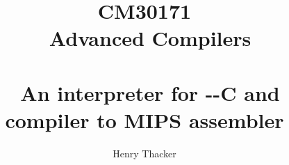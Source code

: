 \documentclass[a4paper,11pt]{report}
\title{\textbf{CM30171 \\ \ Advanced Compilers} \\ \ \\ \ An interpreter for -{}-C and compiler to MIPS assembler}
\author{Henry Thacker}
\begin{document}
\maketitle

\tableofcontents




{}
\end{document}
